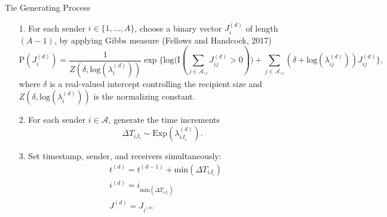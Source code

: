 \documentclass[10pt]{beamer}
\theoremstyle{definition}
\theoremstyle{remark}
\begin{document}
\begin{frame}{Tie Generating Process}
	\begin{itemize}
		\item[1.] For each sender $i \in \{1,...,A\}$, choose a binary vector $J^{(d)}_i$ of length $(A-1)$, by applying Gibbs measure (Fellows and Handcock, 2017) 
		\footnotesize\begin{equation} \text{P}(J_i^{(d)}) = \frac{1}{Z(\delta,\mbox{log}(\lambda_i^{(d)}))} \exp\Big\{ \mbox{log}\big(\text{I}( \sum_{j \in \mathcal{A}_{\backslash i}} J^{(d)}_{ij} > 0 )\big) + \sum_{j \in \mathcal{A}_{\backslash i}} (\delta+\mbox{log}(\lambda_{ij}^{(d)}))J_{ij}^{(d)} \Big\},
		\end{equation}
		\normalsize
		where $\delta$ is a real-valued intercept controlling the recipient size and  $Z(\delta,\mbox{log}(\lambda_i^{(d)}))$ is the normalizing constant.\vspace{0.4cm}
		\item[2.] For each sender $i \in \mathcal{A}$, generate the time increments 
	\footnotesize	\begin{equation*}
		\Delta T_{i{J_i}} \sim \mbox{Exp}(\lambda_{i{J_i}}^{(d)}).
		\end{equation*}\normalsize
		\item[3.] Set timestamp, sender, and receivers simultaneously:
	\footnotesize	\begin{equation*}
		\begin{aligned}
		&t^{(d)} = t^{(d-1)}+\mbox{min}(\Delta T_{i{J_i}})\\
		&i^{(d)} = i_{\mbox{min}(\Delta T_{i{J_i}})} \\
		&J^{(d)} = J_{i^{(d)}}
		\end{aligned}
		\end{equation*}
		\normalsize
		\end{itemize}
\end{frame}
\end{document}
